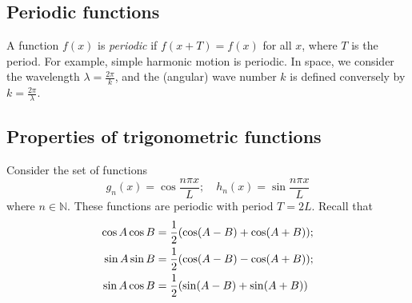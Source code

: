 \subsection{Periodic functions}
A function \( f(x) \) is \textit{periodic} if \( f(x+T) = f(x) \) for all \( x \), where \( T \) is the period.
For example, simple harmonic motion is periodic.
In space, we consider the wavelength \( \lambda = \frac{2\pi}{k} \), and the (angular) wave number \( k \) is defined conversely by \( k = \frac{2\pi}{\lambda} \).

\subsection{Properties of trigonometric functions}
Consider the set of functions
\[
	g_n(x) = \cos \frac{n\pi x}{L};\quad h_n(x) = \sin \frac{n\pi x}{L}
\]
where \( n \in \mathbb N \).
These functions are periodic with period \( T = 2L \).
Recall that
\begin{align*}
	\cos A \cos B & = \frac{1}{2}\qty(\cos(A-B) + \cos(A+B)); \\
	\sin A \sin B & = \frac{1}{2}\qty(\cos(A-B) - \cos(A+B)); \\
	\sin A \cos B & = \frac{1}{2}\qty(\sin(A-B) + \sin(A+B))
\end{align*}

